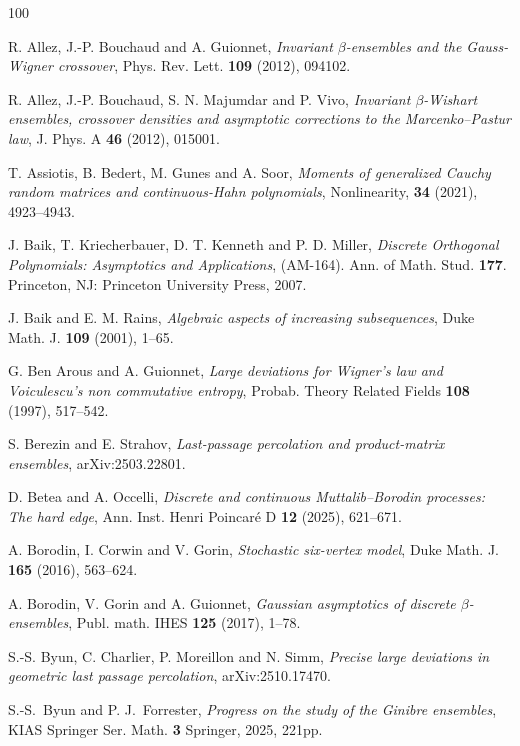 \documentclass{amsart}
\theoremstyle{plain}
\theoremstyle{remark}
\numberwithin{equation}{section}
\begin{document}
 
\begin{thebibliography}{100}
 
 
 R. Allez, J.-P. Bouchaud and A. Guionnet, \emph{Invariant $\beta$-ensembles and the Gauss-Wigner crossover}, Phys. Rev. Lett. \textbf{109} (2012), 094102.

 R. Allez, J.-P. Bouchaud, S. N. Majumdar and P. Vivo, \emph{Invariant $\beta$-Wishart ensembles, crossover densities
and asymptotic corrections to the Marcenko–Pastur law}, J. Phys. A \textbf{46} (2012), 015001. 
  

 T. Assiotis, B. Bedert, M. Gunes and A. Soor, \emph{Moments of generalized Cauchy random matrices and continuous-Hahn polynomials}, Nonlinearity, \textbf{34} (2021), 4923--4943.

 J. Baik, T. Kriecherbauer, D. T. Kenneth and P. D. Miller, \emph{Discrete Orthogonal Polynomials: Asymptotics and Applications}, (AM-164). Ann. of Math. Stud. \textbf{177}. Princeton, NJ: Princeton University Press, 2007.

 J. Baik and E. M. Rains, \emph{Algebraic aspects of increasing subsequences}, Duke Math. J. \textbf{109} (2001), 1--65.

 G. Ben Arous and A. Guionnet, \emph{Large deviations for Wigner's law and Voiculescu's non commutative entropy}, Probab. Theory Related Fields \textbf{108} (1997), 517--542. 

 S. Berezin and E. Strahov, \textit{Last-passage percolation and product-matrix ensembles}, arXiv:2503.22801. 

 D. Betea and A. Occelli, \emph{Discrete and continuous Muttalib–Borodin processes: The hard edge}, Ann. Inst. Henri Poincaré D \textbf{12} (2025), 621--671.

 A. Borodin, I. Corwin and V. Gorin, \emph{Stochastic six-vertex model}, Duke Math. J. \textbf{165} (2016), 563--624.

 A. Borodin, V. Gorin and A. Guionnet, \emph{Gaussian asymptotics of discrete $\beta$-ensembles}, Publ. math. IHES \textbf{125} (2017), 1--78.
 

 S.-S. Byun, C. Charlier, P. Moreillon and N. Simm, \emph{Precise large deviations in geometric last passage percolation}, arXiv:2510.17470. 

 S.-S.~Byun and P. J.~Forrester, \emph{Progress on the study of the Ginibre ensembles}, KIAS Springer Ser. Math. \textbf{3} Springer, 2025, 221pp.


\end{thebibliography}
\end{document}
